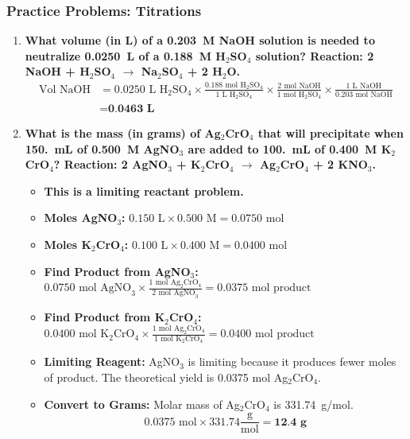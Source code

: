 \documentclass{article}
\begin{document}
\subsubsection*{Practice Problems: Titrations}
\begin{enumerate}[itemsep=5pt]
    \item \textbf{What volume (in L) of a \SI{0.203}{M} NaOH solution is needed to neutralize \SI{0.0250}{L} of a \SI{0.188}{M} H\(_2\)SO\(_4\) solution? Reaction: 2 NaOH + H\(_2\)SO\(_4\) \(\rightarrow\) Na\(_2\)SO\(_4\) + 2 H\(_2\)O.}
    \begin{align*}
        \text{Vol NaOH} &= 0.0250 \text{ L H}_2\text{SO}_4 \times \frac{0.188 \text{ mol H}_2\text{SO}_4}{1 \text{ L H}_2\text{SO}_4} \times \frac{2 \text{ mol NaOH}}{1 \text{ mol H}_2\text{SO}_4} \times \frac{1 \text{ L NaOH}}{0.203 \text{ mol NaOH}} \\
        &= \textbf{0.0463 L}
    \end{align*}
    \item \textbf{What is the mass (in grams) of Ag\(_2\)CrO\(_4\) that will precipitate when \SI{150.}{mL} of \SI{0.500}{M} AgNO\(_3\) are added to \SI{100.}{mL} of \SI{0.400}{M} K\(_2\)CrO\(_4\)? Reaction: 2 AgNO\(_3\) + K\(_2\)CrO\(_4\) \(\rightarrow\) Ag\(_2\)CrO\(_4\) + 2 KNO\(_3\).}
    \begin{itemize}
        \item \textbf{This is a limiting reactant problem.}
        \item \textbf{Moles AgNO\(_3\):} \(0.150 \text{ L} \times 0.500 \text{ M} = 0.0750 \text{ mol}\)
        \item \textbf{Moles K\(_2\)CrO\(_4\):} \(0.100 \text{ L} \times 0.400 \text{ M} = 0.0400 \text{ mol}\)
        \item \textbf{Find Product from AgNO\(_3\):} \(0.0750 \text{ mol AgNO}_3 \times \frac{1 \text{ mol Ag}_2\text{CrO}_4}{2 \text{ mol AgNO}_3} = 0.0375 \text{ mol product}\)
        \item \textbf{Find Product from K\(_2\)CrO\(_4\):} \(0.0400 \text{ mol K}_2\text{CrO}_4 \times \frac{1 \text{ mol Ag}_2\text{CrO}_4}{1 \text{ mol K}_2\text{CrO}_4} = 0.0400 \text{ mol product}\)
        \item \textbf{Limiting Reagent:} AgNO\(_3\) is limiting because it produces fewer moles of product. The theoretical yield is 0.0375 mol Ag\(_2\)CrO\(_4\).
        \item \textbf{Convert to Grams:} Molar mass of Ag\(_2\)CrO\(_4\) is \SI{331.74}{g/mol}.
        \[ 0.0375 \text{ mol} \times 331.74 \frac{\text{g}}{\text{mol}} = \textbf{12.4 g} \]

\end{itemize}
\end{enumerate}
\end{document}
